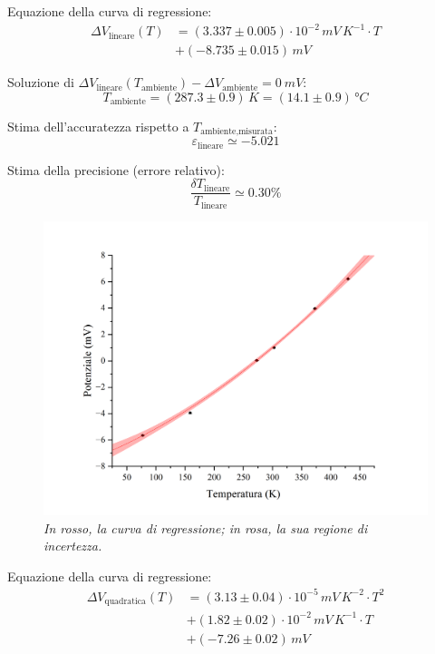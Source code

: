 \documentclass{article}
\begin{document}
Equazione della curva di regressione:
\[\begin{aligned}\Delta V_\text{lineare}(T)
  &= (3.337\pm0.005)\cdot10^{-2}\,\unit{mV\,K^{-1}}\cdot T \\
  &+ (-8.735\pm0.015)\,\unit{mV}
\end{aligned}\]

Soluzione di $
  \Delta V_\text{lineare}(T_\text{ambiente}) -
  \Delta V_\text{ambiente} = \qty{0}{mV}$:
\[T_\text{ambiente}
  = (287.3\pm0.9)\,\unit{K}
  = (14.1\pm0.9)\,\unit{\degree C}
\]

Stima dell'accuratezza rispetto a $T_\text{ambiente,misurata}$:
\[ \varepsilon_\text{lineare} \simeq -5.021 \]

Stima della precisione (errore relativo):
\[ \frac{\delta T_\text{lineare}}{T_\text{lineare}} \simeq 0.30\% \]

\pagebreak
\begin{figure}[H]
  \centering
  \includegraphics[trim={2cm 0.6cm 3cm 1cm},clip,width=\textwidth]{img/regressione2.png}
  \caption*{\emph{
    In rosso, la curva di regressione; in rosa, la sua regione di incertezza.
  }}
\end{figure}

Equazione della curva di regressione:
\[\begin{aligned}\Delta V_\text{quadratica}(T)
  &= (3.13\pm0.04)\cdot10^{-5}\,\unit{mV\,K^{-2}}\cdot T^2 \\
  &+ (1.82\pm0.02)\cdot10^{-2}\,\unit{mV\,K^{-1}}\cdot T \\
  &+ (-7.26\pm0.02)\,\unit{mV}
\end{aligned}\]
\end{document}
